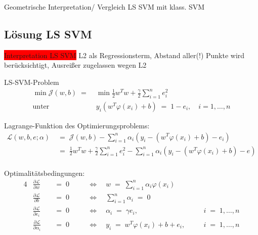 \documentclass{beamer}
\begin{document}
{\begin{frame}
	Geometrische Interpretation/ Vergleich LS SVM mit klass. SVM
\end{frame}






\subsection{Lösung LS SVM}

\begin{frame}
	\colorbox{red}{Interpretation LS SVM}
	L2 als Regressionsterm, Abstand aller(!) Punkte wird berücksichtigt, Ausreißer zugelassen wegen L2\\
	
	\begin{block}{LS-SVM-Problem}
		\begin{align}
			\min \mathcal{J}(w,b)\;=\;&\min\frac{1}{2}w^Tw+\frac{\gamma}{2}\sum_{i=1}^{n}e_i^2\\
			\text{unter}\quad&y_i\left(w^T\varphi(x_i)+b\right)\;=\;1-e_i,\quad i=1,\dots,n
		\end{align}
	\end{block}
\end{frame}

\begin{frame}
	Lagrange-Funktion des Optimierungsproblems:
	\begin{align}
		\mathcal{L}(w,b,e;\alpha)&\;=\;\mathcal{J}(w,b)-\sum_{i=1}^{n}\alpha_i\left(y_i-\left(w^T\varphi(x_i)+b\right)-e_i\right)\\
		&\;=\;\frac{1}{2}w^Tw+\frac{\gamma}{2}\sum_{i=1}^{n}e_i^2-\sum_{i=1}^{n}\alpha_i\left(y_i-\left(w^T\varphi(x_i)+b\right)-e\right)\\
	\end{align}
\end{frame}

\begin{frame}
	Optimalitätsbedingungen:
	\begin{alignat}{4}
		& \frac{\partial \mathcal{L}}{\partial w} &&\;=\;0 && \quad\Leftrightarrow\quad w\;=\;\sum_{i=1}^{n}\alpha_i\varphi(x_i) && \\[0,3cm]
		& \frac{\partial \mathcal{L}}{\partial b} &&\;=\;0 && \quad\Leftrightarrow\quad \sum_{i=1}^{n}\alpha_i\;=\;0 && \\[0,3cm]
		& \frac{\partial \mathcal{L}}{\partial e_i} &&\;=\;0 && \quad\Leftrightarrow\quad \alpha_i\;=\;\gamma e_i, && i\;=\;1,\dots,n\\[0,3cm]
		& \frac{\partial \mathcal{L}}{\partial \alpha_i} &&\;=\;0 && \quad\Leftrightarrow\quad y_i\;=\;w^T\varphi(x_i)+b+e_i,\quad && i\;=\;1,\dots,n
	\end{alignat}
\end{frame}

}
\end{document}
